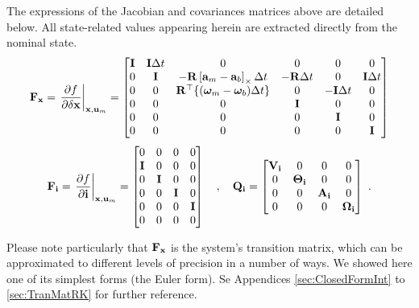 The expressions of the Jacobian and covariances matrices above are detailed below. 
All state-related values appearing herein are extracted directly from the nominal state.
%
\begin{equation} \label{equ:Fx_local_euler}
{\bf F}_{\bf x} = \left.\frac{\partial f}{\partial\delta{\bf x}}\right|_{{\bf x},{\bf u}_m} = \begin{bmatrix}
{\bf I} & {\bf I}\Delta t & 0                             & 0               & 0                     & 0 \\
0 & {\bf I}    & -{\bf R}\left[{\bf a}_m-{\bf a}_b\right]_\times\Delta t     & -{\bf R}\Delta t            & 0                     & {\bf I}\Delta t \\
0 & 0    & {\bf R}^{\top}\{({\bm \omega}_m-{\bm \omega}_b)\Delta t\}   & 0               & -{\bf I}\Delta t                  & 0 \\
0 & 0    & 0                             & {\bf I} & 0                     & 0 \\
0 & 0    & 0                             & 0               & {\bf I}  & 0 \\
0 & 0    & 0                             & 0               & 0                     & {\bf I} \\
\end{bmatrix}
\end{equation}%
%
\begin{equation}
{\bf F}_{\bf i} = \left.\frac{\partial f}{\partial{\bf i}}\right|_{{\bf x},{\bf u}_m} = \begin{bmatrix}
0 & 0 & 0 & 0 \\
{\bf I} & 0 & 0 & 0 \\
0 & {\bf I} & 0 & 0 \\
0 & 0 & {\bf I} & 0 \\
0 & 0 & 0 & {\bf I} \\
0 & 0 & 0 & 0 
\end{bmatrix}  
\quad,\quad
{\bf Q}_{\bf i} = \begin{bmatrix}
{\bf V}_{\bf i} & 0        & 0      & 0 \\ 
0      & {\bm \Theta}_{\bf i} & 0      & 0 \\ 
0      & 0        & {\bf A}_{\bf i} & 0 \\ 
0      & 0        & 0      & {\bm \Omega}_{\bf i} 
\end{bmatrix}~.
\end{equation}%
%

Please note particularly that ${\bf F}_{\bf x}$ is the system's transition matrix, which can be approximated to different levels of precision in a number of ways. 
We showed here one of its simplest forms (the Euler form). 
Se Appendices \ref{sec:ClosedFormInt} to \ref{sec:TranMatRK} for further reference.

